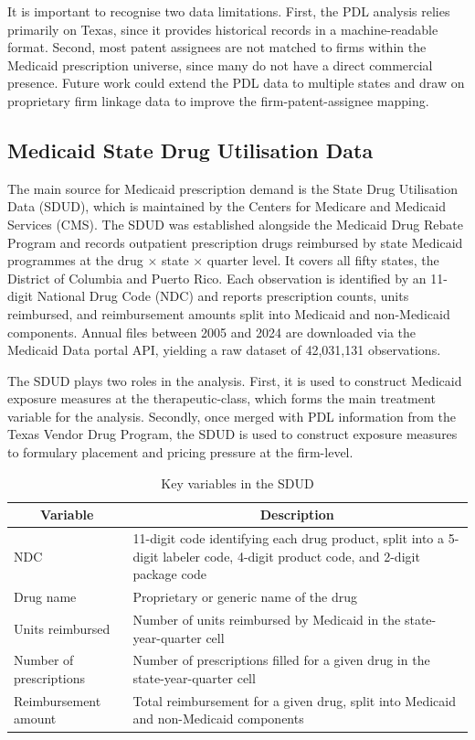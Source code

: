 \documentclass[12pt]{article}
\begin{document}
It is important to recognise two data limitations. First, the PDL analysis relies primarily on Texas, since it provides historical records in a machine-readable format. Second, most patent assignees are not matched to firms within the Medicaid prescription universe, since many do not have a direct commercial presence. Future work could extend the PDL data to multiple states and draw on proprietary firm linkage data to improve the firm-patent-assignee mapping.



\subsection{Medicaid State Drug Utilisation Data}
\label{sec:sdud}

The main source for Medicaid prescription demand is the State Drug Utilisation Data (SDUD), which is maintained by the Centers for Medicare and Medicaid Services (CMS). The SDUD was established alongside the Medicaid Drug Rebate Program and records outpatient prescription drugs reimbursed by state Medicaid programmes at the drug $\times$ state $\times$ quarter level. It covers all fifty states, the District of Columbia and Puerto Rico. Each observation is identified by an 11-digit National Drug Code (NDC) and reports prescription counts, units reimbursed, and reimbursement amounts split into Medicaid and non-Medicaid components. Annual files between 2005 and 2024 are downloaded via the Medicaid Data portal API, yielding a raw dataset of 42,031,131 observations.

The SDUD plays two roles in the analysis. First, it is used to construct Medicaid exposure measures at the therapeutic-class, which forms the main treatment variable for the analysis. Secondly, once merged with PDL information from the Texas Vendor Drug Program, the SDUD is used to construct exposure measures to formulary placement and pricing pressure at the firm-level.

\begin{table}[htbp]
\centering
\caption{Key variables in the SDUD}
\begin{tabular*}{\textwidth}{p{} @{\extracolsep{\fill}} p{}}
\toprule
\multicolumn{1}{c}{Variable} & \multicolumn{1}{c}{Description} \\
\midrule
NDC & 11-digit code identifying each drug product, split into a 5-digit labeler code, 4-digit product code, and 2-digit package code \\
Drug name & Proprietary or generic name of the drug \\
Units reimbursed & Number of units reimbursed by Medicaid in the state-year-quarter cell \\
Number of prescriptions & Number of prescriptions filled for a given drug in the state-year-quarter cell \\
Reimbursement amount & Total reimbursement for a given drug, split into Medicaid and non-Medicaid components \\
\bottomrule
\end{tabular*}
\end{table}
\end{document}
